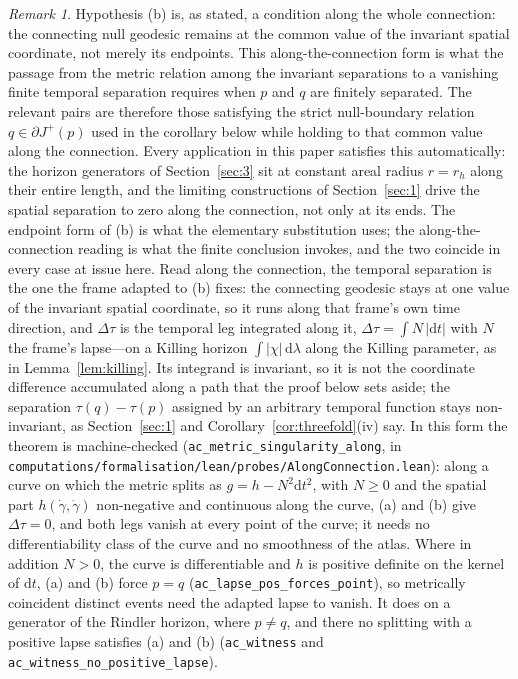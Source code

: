 \documentclass[11pt,a4paper]{article}
\theoremstyle{plain}
\theoremstyle{remark}
\newtheorem{remark}{Remark}
\begin{document}
\begin{remark}
Hypothesis (b) is, as stated, a condition along the whole connection: the connecting null geodesic remains at the common value of the invariant spatial coordinate, not merely its endpoints. This along-the-connection form is what the passage from the metric relation among the invariant separations to a vanishing finite temporal separation requires when $p$ and $q$ are finitely separated. The relevant pairs are therefore those satisfying the strict null-boundary relation $q\in\partial J^{+}(p)$ used in the corollary below while holding to that common value along the connection. Every application in this paper satisfies this automatically: the horizon generators of Section~\ref{sec:3} sit at constant areal radius $r=r_h$ along their entire length, and the limiting constructions of Section~\ref{sec:1} drive the spatial separation to zero along the connection, not only at its ends. The endpoint form of (b) is what the elementary substitution uses; the along-the-connection reading is what the finite conclusion invokes, and the two coincide in every case at issue here. Read along the connection, the temporal separation is the one the frame adapted to (b) fixes: the connecting geodesic stays at one value of the invariant spatial coordinate, so it runs along that frame's own time direction, and $\Delta\tau$ is the temporal leg integrated along it, $\Delta\tau=\int N\,|\mathrm{d}t|$ with $N$ the frame's lapse---on a Killing horizon $\int|\chi|\,\mathrm{d}\lambda$ along the Killing parameter, as in Lemma~\ref{lem:killing}. Its integrand is invariant, so it is not the coordinate difference accumulated along a path that the proof below sets aside; the separation $\tau(q)-\tau(p)$ assigned by an arbitrary temporal function stays non-invariant, as Section~\ref{sec:1} and Corollary~\ref{cor:threefold}(iv) say. In this form the theorem is machine-checked (\texttt{ac\_metric\_singularity\_along}, in \texttt{computations/formalisation/lean/probes/AlongConnection.lean}): along a curve on which the metric splits as $g=h-N^{2}\mathrm{d}t^{2}$, with $N\ge0$ and the spatial part $h(\dot\gamma,\dot\gamma)$ non-negative and continuous along the curve, (a) and (b) give $\Delta\tau=0$, and both legs vanish at every point of the curve; it needs no differentiability class of the curve and no smoothness of the atlas. Where in addition $N>0$, the curve is differentiable and $h$ is positive definite on the kernel of $\mathrm{d}t$, (a) and (b) force $p=q$ (\texttt{ac\_lapse\_pos\_forces\_point}), so metrically coincident distinct events need the adapted lapse to vanish. It does on a generator of the Rindler horizon, where $p\neq q$, and there no splitting with a positive lapse satisfies (a) and (b) (\texttt{ac\_witness} and \texttt{ac\_witness\_no\_positive\_lapse}).
\end{remark}
\end{document}
